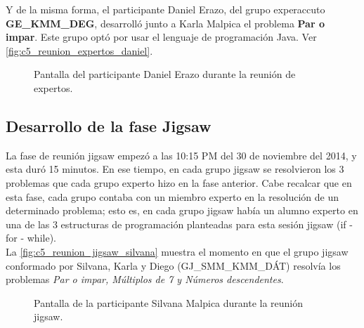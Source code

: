 Y de la misma forma, el participante Daniel Erazo, del grupo experaccuto \textbf{GE\_KMM\_DEG},  desarrolló junto a Karla Malpica el problema \textbf{Par o impar}. Este grupo optó por usar el lenguaje de programación Java. Ver \autoref{fig:c5_reunion_expertos_daniel}.

\begin{figure}
	\centering
	\caption[Reunión de Expertos - Daniel Erazo]{Pantalla del participante Daniel Erazo durante la reunión de expertos.}
	\label{fig:c5_reunion_expertos_daniel}
\end{figure}

\subsection{Desarrollo de la fase Jigsaw}
La fase de reunión jigsaw empezó a las 10:15 PM del 30 de noviembre del 2014, y esta duró 15 minutos. En ese tiempo, en cada grupo jigsaw se resolvieron los 3 problemas que cada grupo experto hizo en la fase anterior. Cabe recalcar que en esta fase, cada grupo contaba con un miembro experto en la resolución de un determinado problema; esto es, en cada grupo jigsaw había un alumno experto en una de las 3 estructuras de programación planteadas para esta sesión jigsaw (if - for - while).\\

La \autoref{fig:c5_reunion_jigsaw_silvana} muestra el momento en que el grupo jigsaw conformado por Silvana, Karla y Diego (GJ\_SMM\_KMM\_DÁT) resolvía los problemas \emph{Par o impar, Múltiplos de 7 y Números descendentes}.

\begin{figure}
	\centering
	\caption[Reunión Jigsaw - Silvana Malpica]{Pantalla de la participante Silvana Malpica durante la reunión jigsaw.}
	\label{fig:c5_reunion_jigsaw_silvana}
\end{figure}

